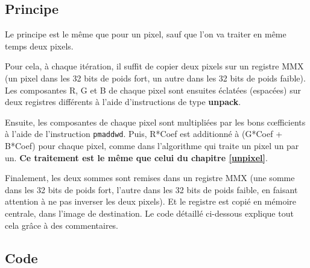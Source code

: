 \subsection{Principe}
Le principe est le même que pour un pixel, sauf que l'on va traiter en même temps deux pixels.

\medskip

Pour cela, à chaque itération, il suffit de copier deux pixels sur un registre MMX (un pixel dans les 32 bits de poids fort, un autre dans les 32 bits de poids faible). Les composantes R, G et B de chaque pixel sont ensuites \og éclatées\fg{} (espacées) sur deux registres différents à l'aide d'instructions de type \textbf{unpack}.

\medskip

Ensuite, les composantes de chaque pixel sont multipliées par les bons c\oe{}fficients à l'aide de l'instruction \lstinline{pmaddwd}. Puis, R*Coef est additionné à (G*Coef + B*Coef) pour chaque pixel, comme dans l'algorithme qui traite un pixel un par un. \textbf{Ce traitement est le même que celui du chapitre \ref{unpixel}}.

\medskip

Finalement, les deux sommes sont remises dans un registre MMX (une somme dans les 32 bits de poids fort, l'autre dans les 32 bits de poids faible, en faisant attention à ne pas inverser les deux pixels). Et le registre est copié en mémoire centrale, dans l'image de destination. Le code détaillé ci-dessous explique tout cela grâce à des commentaires.

\subsection{Code}

